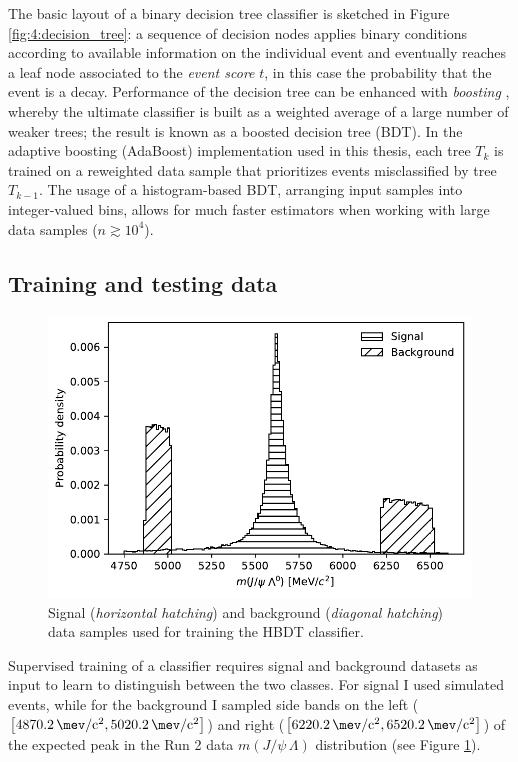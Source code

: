 The basic layout of a binary decision tree classifier is sketched in Figure \ref{fig:4:decision_tree}:
a sequence of decision nodes applies binary conditions according to available information on the individual event and eventually reaches a leaf node associated to the \textit{event score} $t$, in this case the probability that the event is a \demonstratorshort decay.
Performance of the decision tree can be enhanced with \textit{boosting} \cite{Yann:2013}, whereby the ultimate classifier is built as a weighted average of a large number of weaker trees;
the result is known as a boosted decision tree (BDT).
In the adaptive boosting (AdaBoost) implementation used in this thesis, each tree $T_k$ is trained on a reweighted data sample that prioritizes events misclassified by tree $T_{k-1}$.
The usage of a histogram-based BDT, arranging input samples into integer-valued bins, allows for much faster estimators when working with large data samples ($n \gtrsim {10}^4$).


\subsection{Training and testing data}
\label{sec:4:train_test_data}

\begin{figure}[t]
	\centering
	\includegraphics[width=.6\textwidth]{graphics/04-event_selection/sig_bkg_distribution_balance.pdf}
	\caption{Signal (\textit{horizontal hatching}) and background (\textit{diagonal hatching}) data samples used for training the HBDT classifier.
	}
	\label{fig:4:HBDT_training_data}
\end{figure}

Supervised training of a classifier requires signal and background datasets as input to learn to distinguish between the two classes.
For signal I used simulated \demonstratorshort events, while for the background I sampled side bands on the left ($\left[\SI{4870.2}{\mev \per c^2}, \SI{5020.2}{\mev \per c^2}\right]$) and right ($\left[\SI{6220.2}{\mev \per c^2}, \SI{6520.2}{\mev \per c^2}\right]$) of the expected \lbz peak  in the Run 2 data $m(J/\psi\,\Lambda)$ distribution (see Figure \ref{fig:4:HBDT_training_data}).

